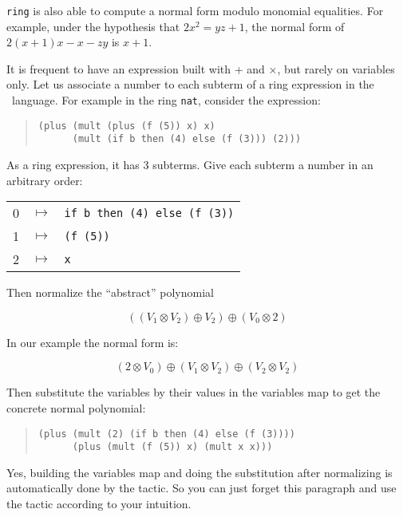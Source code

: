 \texttt{ring} is also able to compute a normal form modulo monomial 
equalities. For example, under the hypothesis that $2x^2 = yz+1$,
 the normal form of $2(x + 1)x - x - zy$ is $x+1$.


It is frequent to have an expression built with + and
  $\times$, but rarely on variables only.
Let us associate a number to each subterm of a ring
expression in the \gallina\ language. For example in the ring
\texttt{nat}, consider the expression:

\begin{quotation}
\begin{verbatim}
(plus (mult (plus (f (5)) x) x)
      (mult (if b then (4) else (f (3))) (2)))
\end{verbatim}
\end{quotation}

\noindent As a ring expression, it has 3 subterms. Give each subterm a
number in an arbitrary order:

\begin{tabular}{ccl}
0 & $\mapsto$ & \verb|if b then (4) else (f (3))| \\
1 & $\mapsto$ & \verb|(f (5))| \\
2 & $\mapsto$ & \verb|x| \\
\end{tabular}

\noindent Then normalize the ``abstract'' polynomial 

$$((V_1 \otimes V_2) \oplus V_2) \oplus (V_0 \otimes 2) $$

\noindent In our example the normal form is:

$$(2 \otimes V_0) \oplus (V_1 \otimes V_2) \oplus (V_2 \otimes V_2)$$

\noindent Then substitute the variables by their values in the variables map to
get the concrete normal polynomial:

\begin{quotation}
\begin{verbatim}
(plus (mult (2) (if b then (4) else (f (3)))) 
      (plus (mult (f (5)) x) (mult x x))) 
\end{verbatim}
\end{quotation}


Yes, building the variables map and doing the substitution after
normalizing is automatically done by the tactic. So you can just forget
this paragraph and use the tactic according to your intuition.

